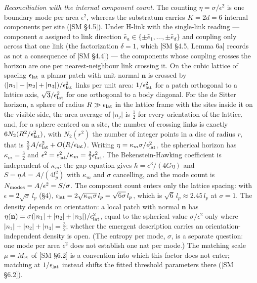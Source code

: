 \documentclass[
]{article}
\begin{document}
\emph{Reconciliation with the internal component count.} The counting
\(\eta = \sigma/\epsilon^2\) is one boundary mode per area
\(\epsilon^2\), whereas the substratum carries \(K = 2d = 6\) internal
components per site ({[}SM §4.5{]}). Under H-link with the single-link
reading --- component \(a\) assigned to link direction
\(\hat e_a \in \{\pm\hat e_1, \ldots, \pm\hat e_d\}\) and coupling only
across that one link (the factorization \(\delta = 1\), which {[}SM
§4.5, Lemma 6a{]} records as not a consequence of {[}SM §4.4{]}) --- the
components whose coupling crosses the horizon are one per
nearest-neighbour link crossing it. On the cubic lattice of spacing
\(\epsilon_{\rm lat}\) a planar patch with unit normal \(\mathbf n\) is
crossed by
\((\lvert n_1\rvert+\lvert n_2\rvert+\lvert n_3\rvert)/\epsilon_{\rm lat}^2\)
links per unit area: \(1/\epsilon_{\rm lat}^2\) for a patch orthogonal
to a lattice axis, \(\sqrt3/\epsilon_{\rm lat}^2\) for one orthogonal to
a body diagonal. For the de Sitter horizon, a sphere of radius
\(R \gg \epsilon_{\rm lat}\) in the lattice frame with the sites inside
it on the visible side, the area average of \(\lvert n_j\rvert\) is
\(\tfrac12\) for every orientation of the lattice, and, for a sphere
centred on a site, the number of crossing links is exactly
\(6N_2(R^2/\epsilon_{\rm lat}^2)\), with \(N_2(r^2)\) the number of
integer points in a disc of radius \(r\), that is
\(\tfrac32 A/\epsilon_{\rm lat}^2 + O(R/\epsilon_{\rm lat})\). Writing
\(\eta = \kappa_m\sigma/\epsilon_{\rm lat}^2\), the spherical horizon
has \(\kappa_m = \tfrac32\) and
\(\epsilon^2 = \epsilon_{\rm lat}^2/\kappa_m = \tfrac23\epsilon_{\rm lat}^2\).
The Bekenstein-Hawking coefficient is independent of \(\kappa_m\): the
gap equation gives \(\hbar = c^3/(4G\eta)\) and
\(S = \eta A = A/(4l_p^2)\) with \(\kappa_m\) and \(\sigma\) cancelling,
and the mode count is \(N_{\rm modes} = A/\epsilon^2 = S/\sigma\). The
component count enters only the lattice spacing: with
\(\epsilon = 2\sqrt{\sigma}\,l_p\) (§4),
\(\epsilon_{\rm lat} = 2\sqrt{\kappa_m\sigma}\,l_p = \sqrt{6\sigma}\,l_p\),
which is \(\sqrt6\,l_p \approx 2.45\,l_p\) at \(\sigma = 1\). The
density depends on orientation: a local patch with normal \(\mathbf n\)
has
\(\eta(\mathbf n) = \sigma(\lvert n_1\rvert+\lvert n_2\rvert+\lvert n_3\rvert)/\epsilon_{\rm lat}^2\),
equal to the spherical value \(\sigma/\epsilon^2\) only where
\(\lvert n_1\rvert+\lvert n_2\rvert+\lvert n_3\rvert = \tfrac32\);
whether the emergent description carries an orientation-independent
density is open. (The entropy per mode, \(\sigma\), is a separate
question: one mode per area \(\epsilon^2\) does not establish one nat
per mode.) The matching scale \(\mu = M_{\text{Pl}}\) of {[}SM §6.2{]}
is a convention into which this factor does not enter; matching at
\(1/\epsilon_{\rm lat}\) instead shifts the fitted threshold parameters
there ({[}SM §6.2{]}).
\end{document}

